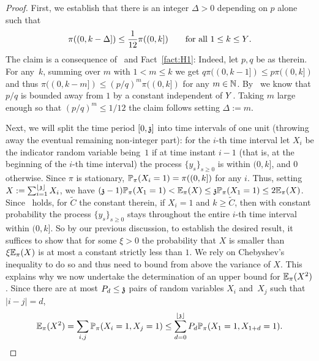 \begin{proof}
First, we establish that there is an integer $\Delta>0$ depending on $p$ alone such that
\begin{equation}\label{lower:eqn:existDelta}
\pi((0,k-\Delta])\leq\frac{1}{12}\pi((0,k]) \qquad \text{for all $1\leq k\leq\auxY$.}
\end{equation}
The claim is a consequence of~ and Fact~\ref{fact:H1}: 
Indeed, let $p, q$ be as therein. For any~$k$, summing 
over $m$ with $1<m\le k$ we get $q\pi((0,k-1])\leq p\pi((0,k])$ and thus
$\pi((0,k-m])\leq (p/q)^m\pi((0,k])$ for any $m\in\NN$.
By~ we know that $p/q$ is bounded away from $1$ by a constant independent of $\auxY$. 
Taking $m$ large enough so that $(p/q)^m\leq 1/12$ the claim follows setting $\Delta:=m$. 


Next, we will split the time period $[0,\ss]$ into time intervals of one unit (throwing away the eventual remaining non-integer part): for the $i$-th time interval let $X_i$ be the indicator random variable being~$1$ if at time instant $i-1$ (that is, at the beginning of the $i$-th time interval) the process $\{y_s\}_{s \ge 0}$ is within $(0,k]$, and $0$ otherwise. Since $\pi$ is stationary, $\P_{\pi}(X_i=1)=\pi((0,k])$ for any $i$. Thus, setting $X:=\sum_{i=1}^{\lfloor \ss \rfloor} X_i$, we have $(\ss-1)\P_{\pi}(X_1=1)<\EE_{\pi}(X)\leq \ss\P_{\pi}(X_1=1) \le 2\EE_{\pi}(X)$.
Since~ holds, for $\widetilde{C}$ the constant therein, if $X_i=1$ and $k\ge \widetilde{C}$, then with constant probability the process $\{y_s\}_{s \ge 0}$ stays throughout the entire $i$-th time interval within $(0,k]$.
So by our previous discussion, to establish the desired
result, it suffices to show that for some $\xi>0$  the probability that $X$ is smaller than $\xi\EE_{\pi}(X)$ is at most a constant strictly less than $1$. We rely on Chebyshev's inequality to do so and thus need to bound from above the variance of $X$. This explains why we now undertake the determination of an upper bound for $\EE_{\pi}(X^2)$.
Since there are at most $P_d \le \ss$ pairs of random variables $X_i$ and~$X_j$ such that $|i-j|=d$,
$$
\EE_{\pi}(X^2)=\sum_{i,j} \P_{\pi}(X_i=1,X_j=1) \leq \sum_{d=0}^{\lfloor \ss \rfloor} P_d\P_{\pi}(X_1=1, X_{1+d}=1). 
$$
 

\end{proof}
